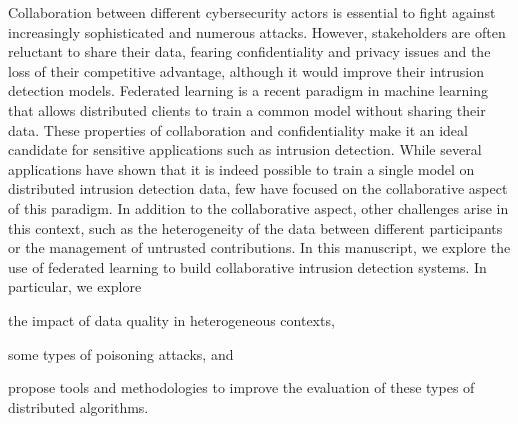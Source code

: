 Collaboration between different cybersecurity actors is essential to fight against increasingly sophisticated and numerous attacks.
However, stakeholders are often reluctant to share their data, fearing confidentiality and privacy issues and the loss of their competitive advantage, although it would improve their intrusion detection models.
Federated learning is a recent paradigm in machine learning that allows distributed clients to train a common model without sharing their data.
These properties of collaboration and confidentiality make it an ideal candidate for sensitive applications such as intrusion detection.
While several applications have shown that it is indeed possible to train a single model on distributed intrusion detection data, few have focused on the collaborative aspect of this paradigm.
In addition to the collaborative aspect, other challenges arise in this context, such as the heterogeneity of the data between different participants or the management of untrusted contributions.
%
In this manuscript, we explore the use of federated learning to build collaborative intrusion detection systems.
In particular, we explore
\begin{enumerate*}[label={\small(\roman*)}]
  \item the impact of data quality in heterogeneous contexts,
  \item some types of poisoning attacks, and
  \item propose tools and methodologies to improve the evaluation of these types of distributed algorithms.
\end{enumerate*}